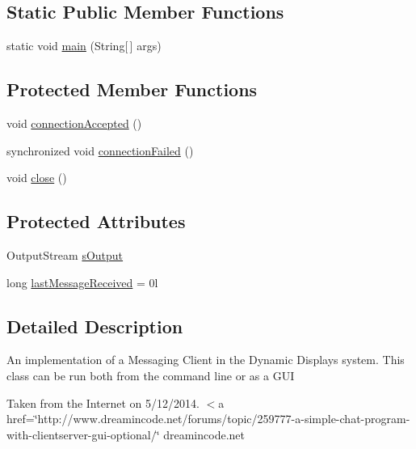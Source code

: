 \subsection*{Static Public Member Functions}
\begin{DoxyCompactItemize}
\item 
static void \hyperlink{classgov_1_1fnal_1_1ppd_1_1dd_1_1chat_1_1MessagingClient_aecbd81343fff7acb75d14ba29c973ed3}{main} (String\mbox{[}$\,$\mbox{]} args)
\end{DoxyCompactItemize}
\subsection*{Protected Member Functions}
\begin{DoxyCompactItemize}
\item 
void \hyperlink{classgov_1_1fnal_1_1ppd_1_1dd_1_1chat_1_1MessagingClient_ae7a2a256431770ac9b0f06d444aa636e}{connection\-Accepted} ()
\item 
synchronized void \hyperlink{classgov_1_1fnal_1_1ppd_1_1dd_1_1chat_1_1MessagingClient_ab42c0b4f0a822c6d2612f1121698ae01}{connection\-Failed} ()
\item 
void \hyperlink{classgov_1_1fnal_1_1ppd_1_1dd_1_1chat_1_1MessagingClient_a701c9889979e93718a0066cb45f063bb}{close} ()
\end{DoxyCompactItemize}
\subsection*{Protected Attributes}
\begin{DoxyCompactItemize}
\item 
Output\-Stream \hyperlink{classgov_1_1fnal_1_1ppd_1_1dd_1_1chat_1_1MessagingClient_aad2bc447bb305f210db3d55142adc077}{s\-Output}
\item 
long \hyperlink{classgov_1_1fnal_1_1ppd_1_1dd_1_1chat_1_1MessagingClient_a5a6bddbcf19712e979b10e3f122c29bc}{last\-Message\-Received} = 0l
\end{DoxyCompactItemize}


\subsection{Detailed Description}
An implementation of a Messaging Client in the Dynamic Displays system. This class can be run both from the command line or as a G\-U\-I 

Taken from the Internet on 5/12/2014. $<$a href=\char`\"{}http\-://www.\-dreamincode.\-net/forums/topic/259777-\/a-\/simple-\/chat-\/program-\/with-\/clientserver-\/gui-\/optional/\char`\"{} dreamincode.\-net 

